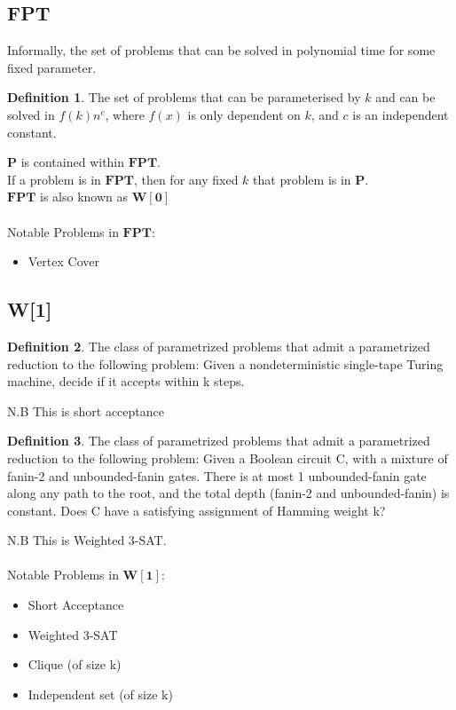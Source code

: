 \documentclass[]{article}
\theoremstyle{definition}
\newtheorem{definition}{Definition}[section]
\begin{document}
\subsection{FPT}
\label{sec:FPT}
Informally, the set of problems that can be solved in polynomial time for some fixed parameter.
\\
\begin{definition}
	The set of problems that can be parameterised by $k$ and can be solved in $f(k)n^c$, where $f(x)$ is only dependent on $k$, and $c$ is an independent constant.
\end{definition}
$ $
\\
\hyperref[sec:P]{$\mathbf{P}$} is contained within $\mathbf{FPT}$.
\\
If a problem is in $\mathbf{FPT}$, then for any fixed $k$ that problem is in \hyperref[sec:P]{$\mathbf{P}$}.
\\
$\mathbf{FPT}$ is also known as \hyperref[sec:W]{$\mathbf{W[0]}$}
$ $
\\
\\
Notable Problems in $\mathbf{FPT}$:
\begin{itemize}
	\item Vertex Cover
\end{itemize}
\subsection{W[1]}
\label{sec:W[1]}

\begin{definition}
	The class of parametrized problems that admit a parametrized reduction to the following problem:
	Given a	nondeterministic single-tape Turing machine, decide if it accepts within k steps.
\end{definition}
N.B This is short acceptance
\begin{definition}
	The class of parametrized problems that admit a parametrized reduction to the following problem:
	Given a Boolean circuit C, with a mixture of fanin-2 and unbounded-fanin gates. There is at most 1 unbounded-fanin gate along any path to the root, and the total depth (fanin-2 and unbounded-fanin) is constant. Does C have a satisfying assignment of Hamming weight k?
\end{definition}
N.B This is Weighted 3-SAT.
\\
\\
Notable Problems in $\mathbf{W[1]}$:
\begin{itemize}
	\item Short Acceptance
	\item Weighted 3-SAT
	\item Clique (of size k)
	\item Independent set (of size k)
\end{itemize}
\end{document}
